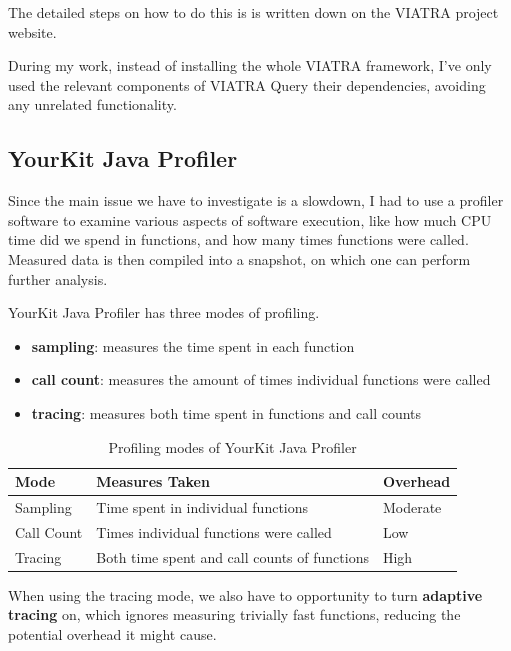 \documentclass[11pt,a4paper,oneside]{report}
\begin{document}
The detailed steps on how to do this is is written down on the VIATRA project
website\cite{ujhelyi_harmath_david_nagy_hegedus_2019}.

During my work, instead of installing the whole VIATRA framework, I've only
used the relevant components of VIATRA Query their dependencies, avoiding any
unrelated functionality.

\subsection{YourKit Java Profiler}
Since the main issue we have to investigate is a slowdown, I had to use a
profiler software to examine various aspects of software execution, like how
much CPU time did we spend in functions, and how many times functions were
called. Measured data is then compiled into a snapshot, on which one can perform
further analysis.

YourKit Java Profiler has three modes of profiling.
\begin{itemize}
    \item{\textbf{sampling}: measures the time spent in each function}
    \item{\textbf{call count}: measures the amount of times individual functions were called}
    \item{\textbf{tracing}: measures both time spent in functions and call counts}
\end{itemize}

\begin{table}[ht]
    \footnotesize
    \centering
    \begin{tabular}{ l l l }
        \toprule
        Mode & Measures Taken & Overhead \\
        \midrule
        Sampling & Time spent in individual functions & Moderate \\
        Call Count & Times individual functions were called & Low \\
        Tracing & Both time spent and call counts of functions & High \\
        \bottomrule
    \end{tabular}
    \caption{Profiling modes of YourKit Java Profiler}
    \label{tab:profiler-modes}
\end{table}

When using the tracing mode, we also have to opportunity to turn
\textbf{adaptive tracing} on, which ignores measuring trivially fast functions,
reducing the potential overhead it might cause.
\end{document}
